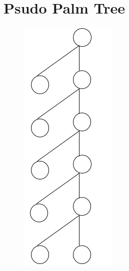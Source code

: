 \section{Psudo Palm Tree}
	\begin{figure}[H]
		\centering
		\includegraphics{images/pseudo_palm_tree}
	\end{figure}
	
